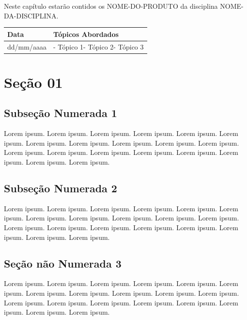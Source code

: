 \documentclass[
]{book}
\begin{document}
Neste capítulo estarão contidos os NOME-DO-PRODUTO da disciplina NOME-DA-DISCIPLINA.

\begin{longtable}[]{@{}ll@{}}
\toprule()
Data & Tópicos Abordados \\
\midrule()
\endhead
dd/mm/aaaa & - Tópico 1- Tópico 2- Tópico 3 \\
\bottomrule()
\end{longtable}

\hypertarget{seuxe7uxe3o-01}{%
\section{Seção 01}\label{seuxe7uxe3o-01}}

\hypertarget{subseuxe7uxe3o-numerada-1}{%
\subsection{Subseção Numerada 1}\label{subseuxe7uxe3o-numerada-1}}

Lorem ipsum. Lorem ipsum. Lorem ipsum. Lorem ipsum. Lorem ipsum. Lorem ipsum. Lorem ipsum. Lorem ipsum. Lorem ipsum. Lorem ipsum. Lorem ipsum. Lorem ipsum. Lorem ipsum. Lorem ipsum. Lorem ipsum. Lorem ipsum. Lorem ipsum. Lorem ipsum. Lorem ipsum.

\hypertarget{subseuxe7uxe3o-numerada-2}{%
\subsection{Subseção Numerada 2}\label{subseuxe7uxe3o-numerada-2}}

Lorem ipsum. Lorem ipsum. Lorem ipsum. Lorem ipsum. Lorem ipsum. Lorem ipsum. Lorem ipsum. Lorem ipsum. Lorem ipsum. Lorem ipsum. Lorem ipsum. Lorem ipsum. Lorem ipsum. Lorem ipsum. Lorem ipsum. Lorem ipsum. Lorem ipsum. Lorem ipsum. Lorem ipsum.

\hypertarget{seuxe7uxe3o-nuxe3o-numerada-3}{%
\subsection*{Seção não Numerada 3}\label{seuxe7uxe3o-nuxe3o-numerada-3}}

Lorem ipsum. Lorem ipsum. Lorem ipsum. Lorem ipsum. Lorem ipsum. Lorem ipsum. Lorem ipsum. Lorem ipsum. Lorem ipsum. Lorem ipsum. Lorem ipsum. Lorem ipsum. Lorem ipsum. Lorem ipsum. Lorem ipsum. Lorem ipsum. Lorem ipsum. Lorem ipsum. Lorem ipsum.
\end{document}
